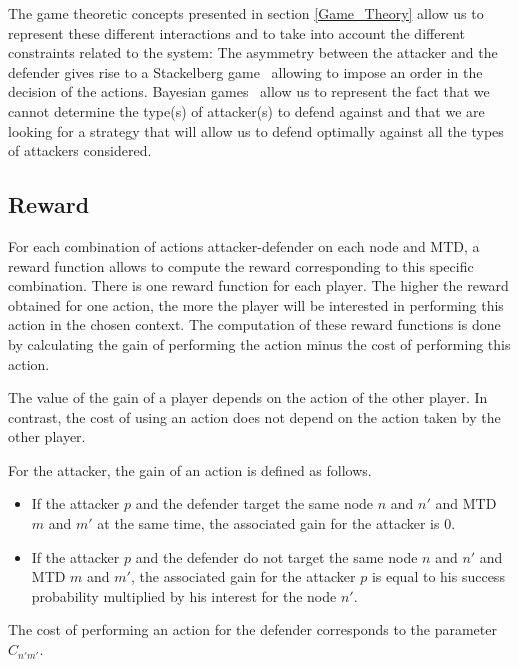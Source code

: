 The game theoretic concepts presented in section \ref{Game_Theory} allow us to represent these different interactions and to take into account the different constraints related to the system: 
The asymmetry between the attacker and the defender gives rise to a Stackelberg game~\cite{conitzer_computing_2006} allowing to impose an order in the decision of the actions.
Bayesian games~\cite{sengupta_game_2017} allow us to represent the fact that we cannot determine the type(s) of attacker(s) to defend against and that we are looking for a strategy that will allow us to defend optimally against all the types of attackers considered.



\subsection{Reward}

For each combination of actions attacker-defender on each node and MTD, a reward function allows to compute the reward corresponding to this specific combination. There is one reward function for each player. The higher the reward obtained for one action, the more the player will be interested in performing this action in the chosen context.
The computation of these reward functions is done by calculating the gain of performing the action minus the cost of performing this action.

The value of the gain of a player depends on the action of the other player. In contrast, the cost of using an action does not depend on the action taken by the other player. 

For the attacker, the gain of an action is defined as follows.
\begin{itemize}
    \item If the attacker $p$ and the defender target the same node $n$ and $n'$ and MTD $m$ and $m'$ at the same time, the associated gain for the attacker is $0$.
\item If the attacker $p$ and the defender do not target the same node $n$ and $n'$ and MTD $m$ and $m'$, the associated gain for the attacker $p$ is equal to his success probability multiplied by his interest for the node $n'$.  
\end{itemize}

The cost of performing an action for the defender corresponds to the parameter $\widehat{C}_{n'm'}$. \\

